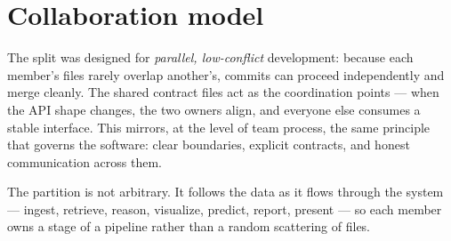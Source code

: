 \section{Collaboration model}
The split was designed for \emph{parallel, low-conflict} development: because
each member's files rarely overlap another's, commits can proceed independently
and merge cleanly. The shared contract files act as the coordination points ---
when the API shape changes, the two owners align, and everyone else consumes a
stable interface. This mirrors, at the level of team process, the same principle
that governs the software: clear boundaries, explicit contracts, and honest
communication across them.

\begin{uanote}
The partition is not arbitrary. It follows the data as it flows through the
system --- ingest, retrieve, reason, visualize, predict, report, present --- so
each member owns a stage of a pipeline rather than a random scattering of files.
\end{uanote}
